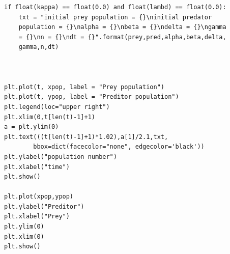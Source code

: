 \documentclass[11pt]{elsarticle}
\begin{document}
\begin{verbatim}
if float(kappa) == float(0.0) and float(lambd) == float(0.0):
    txt = "initial prey population = {}\ninitial predator 
    population = {}\nalpha = {}\nbeta = {}\ndelta = {}\ngamma 
    = {}\nn = {}\ndt = {}".format(prey,pred,alpha,beta,delta,
    gamma,n,dt)



plt.plot(t, xpop, label = "Prey population")
plt.plot(t, ypop, label = "Preditor population")
plt.legend(loc="upper right")
plt.xlim(0,t[len(t)-1]+1)
a = plt.ylim(0)
plt.text(((t[len(t)-1]+1)*1.02),a[1]/2.1,txt,
	    bbox=dict(facecolor="none", edgecolor='black'))
plt.ylabel("population number")
plt.xlabel("time")
plt.show()

plt.plot(xpop,ypop)
plt.ylabel("Preditor")
plt.xlabel("Prey")
plt.ylim(0)
plt.xlim(0)
plt.show()

\end{verbatim}
\end{document}
